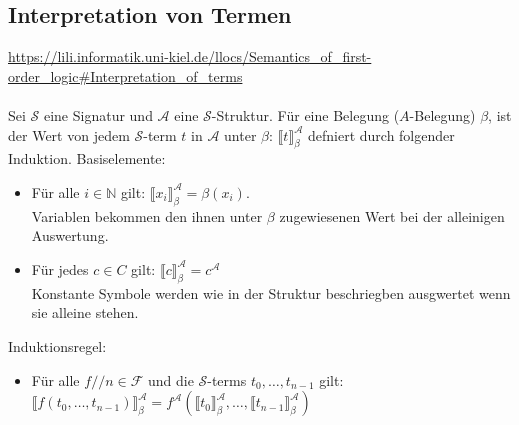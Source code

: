 \documentclass[twocolumn]{article}
\begin{document}
    \subsection{Interpretation von Termen}
    \url{https://lili.informatik.uni-kiel.de/llocs/Semantics_of_first-order_logic#Interpretation_of_terms}\\\\
    Sei $\mathcal S$ eine Signatur und $\mathcal A$ eine $\mathcal S$-Struktur. Für eine Belegung ($A$-Belegung) $\beta$, ist der Wert von jedem  $\mathcal S$-term $t$ in $\mathcal A$ unter $\beta$: $\llbracket t\rrbracket_\beta^\mathcal A$ defniert durch folgender Induktion.
    Basiselemente:
    \begin{itemize}
        \item Für alle $i \in \mathbb{N}$ gilt: $\llbracket x_i\rrbracket_\beta^\mathcal A = \beta(x_i)$.\\
            Variablen bekommen den ihnen unter $\beta$ zugewiesenen Wert bei der alleinigen Auswertung.
        \item Für jedes $c \in C$ gilt: $\llbracket c\rrbracket_\beta^\mathcal A = c^{\mathcal A}$\\
            Konstante Symbole werden wie in der Struktur beschriegben ausgwertet wenn sie alleine stehen.
    \end{itemize}
    Induktionsregel:
    \begin{itemize}
        \item Für alle $f/\!/n \in \mathcal F$ und die $\mathcal S$-terms $t_0, \dots, t_{n-1}$ gilt: $\llbracket f(t_0, \dots, t_{n-1})\rrbracket_\beta^\mathcal A = f^\mathcal A(\llbracket t_0\rrbracket_\beta^\mathcal A, \dots, \llbracket t_{n-1}\rrbracket_\beta^\mathcal A)$
    \end{itemize}
\end{document}
